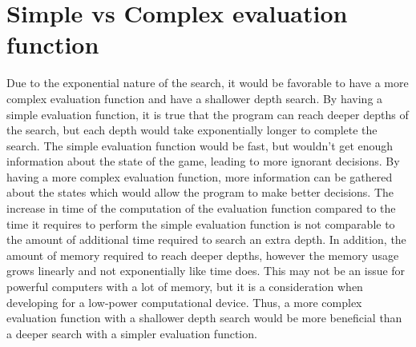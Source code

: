 \documentclass[11pt]{article}
\begin{document}
\section{Simple vs Complex evaluation function}
Due to the exponential nature of the search, it would be favorable to have a more complex evaluation function and have a shallower depth search. By having a simple evaluation function, it is true that the program can reach deeper depths of the search, but each depth would take exponentially longer to complete the search. The simple evaluation function would be fast, but wouldn't get enough information about the state of the game, leading to more ignorant decisions. By having a more complex evaluation function, more information can be gathered about the states which would allow the program to make better decisions. The increase in time of the computation of the evaluation function compared to the time it requires to perform the simple evaluation function is not comparable to the amount of additional time required to search an extra depth. In addition, the amount of memory required to reach deeper depths, however the memory usage grows linearly and not exponentially like time does. This may not be an issue for powerful computers with a lot of memory, but it is a consideration when developing for a low-power computational device. Thus, a more complex evaluation function with a shallower depth search would be more beneficial than a deeper search with a simpler evaluation function.
\end{document}
